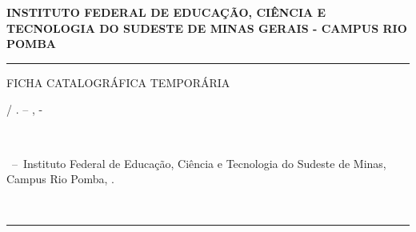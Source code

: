 \documentclass[
	12pt,				%
	openright,			%
	oneside,			%
	a4paper,			%
	english,			%
	french,				%
	spanish,			%
	brazil,				%
	]{abntex2}
\begin{document}
\frenchspacing 


\begin{center}
\textbf{ 
INSTITUTO FEDERAL DE EDUCAÇÃO, CIÊNCIA E TECNOLOGIA DO SUDESTE DE MINAS GERAIS - CAMPUS RIO POMBA}
\end{center}

\imprimircapa

\imprimirfolhaderosto*


%     


\begin{fichacatalografica}
	\vspace*{\fill}					%
	\hrule							%
	\begin{center}					%
	\begin{minipage}[c]{12.5cm}		%
	
	FICHA CATALOGRÁFICA TEMPORÁRIA \\
	\imprimirautor
	
	\hspace{0.5cm} \imprimirtitulo  / \imprimirautor. --
	\imprimirlocal, \imprimirdata-

	\hspace{0.5cm} \imprimirorientadorRotulo~\imprimirorientador\\
	
	\hspace{0.5cm}
	\parbox[t]{\textwidth}{\imprimirtipotrabalho~--~Instituto Federal de Educação, Ciência e Tecnologia do Sudeste de Minas, Campus Rio Pomba,
	\imprimirdata.}\\

	
	\end{minipage}
	\end{center}
	\hrule
\end{fichacatalografica}
\end{document}
